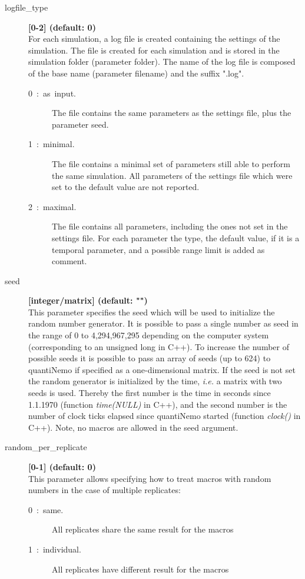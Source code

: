 \documentclass[letterpaper,12pt,oneside]{book}
\begin{document}
\begin{description}
\item[logfile\_type] \textbf{[0-2] (default: 0)}\\
For each simulation, a log file is created containing the settings of the simulation. The file is created for each simulation and is stored in the simulation folder (parameter \textsf{folder}). The name of the log file is composed of the base name (parameter \textsf{filename}) and the suffix ".log". 
\begin{description}
\item[0~:~as~input.] The file contains the same parameters as the settings file, plus the parameter \textsf{seed}.
\item[1~:~minimal.] The file contains a minimal set of parameters still able to perform the same simulation. All parameters of the settings file which were set to the default value are not reported. 
\item[2~:~maximal.] The file contains all parameters, including the ones not set in the settings file. For each parameter the type, the default value, if it is a temporal parameter, and a possible range limit is added as comment.
\end{description}

\item[seed] \textbf{[integer/matrix] (default: "")}\\
This parameter specifies the seed which will be used to initialize the random number generator. It is possible to pass a single number as seed in the range of 0 to 4,294,967,295 depending on the computer system (corresponding to an unsigned long in C++). To increase the number of possible seeds it is possible to pass an array of seeds (up to 624) to quantiNemo if specified as a one-dimensional matrix. If the seed is not set the random generator is initialized by the time, \textit{i.e.} a matrix with two seeds is used. Thereby the first number is the time in seconds since 1.1.1970 (function \textit{time(NULL)} in C++), and the second number is the number of clock ticks elapsed since quantiNemo started (function \textit{clock()} in C++). Note, no macros are allowed in the seed argument.\\

\item[random\_per\_replicate] \textbf{[0-1] (default: 0)}\\
This parameter allows specifying how to treat macros with random numbers in the case of multiple replicates:
\begin{description}
    \item[0~:~same.] All replicates share the same result for the macros
    \item[1~:~individual.] All replicates have different result for the macros
\end{description}


\end{description}
\end{document}
